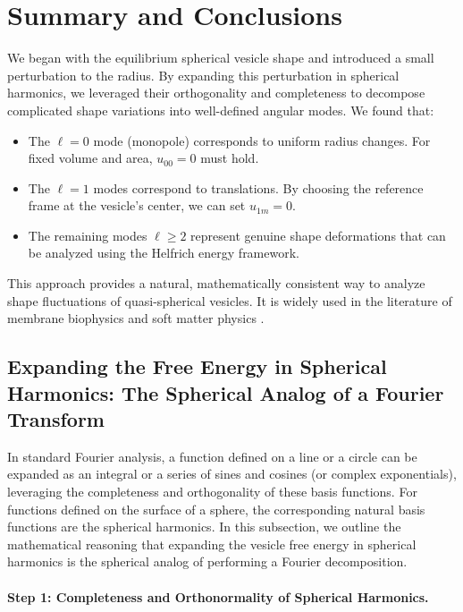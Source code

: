 \documentclass[12pt,a4paper]{article}
\begin{document}
\section{Summary and Conclusions}

We began with the equilibrium spherical vesicle shape and introduced a small perturbation to the radius. By expanding this perturbation in spherical harmonics, we leveraged their orthogonality and completeness to decompose complicated shape variations into well-defined angular modes. We found that:
\begin{itemize}
    \item The $\ell=0$ mode (monopole) corresponds to uniform radius changes. For fixed volume and area, $u_{00}=0$ must hold.
    \item The $\ell=1$ modes correspond to translations. By choosing the reference frame at the vesicle’s center, we can set $u_{1m}=0$.
    \item The remaining modes $\ell\geq2$ represent genuine shape deformations that can be analyzed using the Helfrich energy framework.
\end{itemize}

This approach provides a natural, mathematically consistent way to analyze shape fluctuations of quasi-spherical vesicles. It is widely used in the literature of membrane biophysics and soft matter physics \cite{Seifert1997,Lipowsky1995,Safran1994}.
\subsection{Expanding the Free Energy in Spherical Harmonics: The Spherical Analog of a Fourier Transform}

In standard Fourier analysis, a function defined on a line or a circle can be expanded as an integral or a series of sines and cosines (or complex exponentials), leveraging the completeness and orthogonality of these basis functions. For functions defined on the surface of a sphere, the corresponding natural basis functions are the spherical harmonics. In this subsection, we outline the mathematical reasoning that expanding the vesicle free energy in spherical harmonics is the spherical analog of performing a Fourier decomposition.

\paragraph{Step 1: Completeness and Orthonormality of Spherical Harmonics.}
\end{document}
